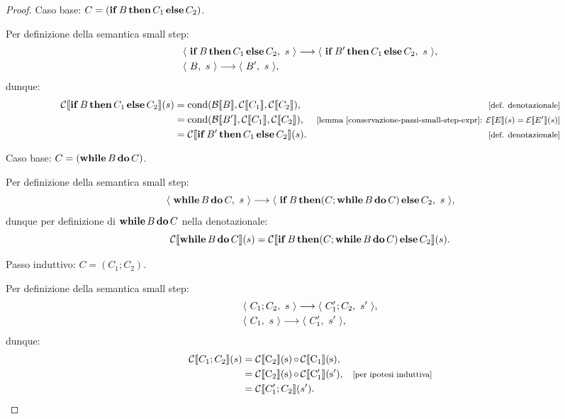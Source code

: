 \begin{proposizione}
\begin{proof}
Caso base: $C = (\mathop{\textup{\textbf{if}}} B \mathop{\textup{\textbf{then}}} C_1 \mathop{\textup{\textbf{else}}} C_2)$.

Per definizione della semantica small step:
\begin{align*}
  &\langle\ \mathop{\textup{\textbf{if}}} B \mathop{\textup{\textbf{then}}} C_1 \mathop{\textup{\textbf{else}}} C_2,\ s\ \rangle \longrightarrow 
  \langle\ \mathop{\textup{\textbf{if}}} B' \mathop{\textup{\textbf{then}}} C_1 \mathop{\textup{\textbf{else}}} C_2,\ s\ \rangle, \\
  &\langle\ B,\ s\ \rangle \longrightarrow \langle\ B',\ s\ \rangle,
\end{align*}
dunque:
\begin{align*}
  \calC\llbracket \kw{if} B \kw{then} C_1 \kw{else} C_2 \rrbracket(s)
  &= \cond(\calB\llbracket B \rrbracket, 
    \calC\llbracket C_1 \rrbracket,
    \calC\llbracket C_2 \rrbracket),
    &\law{def. denotazionale} \\
  &= \cond(\calB\llbracket B' \rrbracket, 
    \calC\llbracket C_1 \rrbracket,
    \calC\llbracket C_2 \rrbracket),
    &\law{lemma  
      \ref{conservazione-passi-small-step-expr}: 
      $\calE\llbracket E \rrbracket(s) 
      = \calE\llbracket E' \rrbracket(s)$} \\
  &= \calC\llbracket \kw{if} B' \kw{then} C_1 \kw{else} C_2 \rrbracket(s).
     &\law{def. denotazionale}
\end{align*}

Caso base:  $C = (\mathop{\textup{\textbf{while}}} B \mathop{\textup{\textbf{do}}} C)$.

Per definizione della semantica small step:
\[
  \langle\ \mathop{\textup{\textbf{while}}} B \mathop{\textup{\textbf{do}}} C,\ s\ \rangle \longrightarrow 
    \langle\ \mathop{\textup{\textbf{if}}} B \mathop{\textup{\textbf{then}}} (C ; \mathop{\textup{\textbf{while}}} B \mathop{\textup{\textbf{do}}} C) \mathop{\textup{\textbf{else}}} C_2,\ s\ \rangle,
\]
dunque per definizione di $\mathop{\textup{\textbf{while}}} B \mathop{\textup{\textbf{do}}} C$ nella denotazionale:
\[
  \mathcal{C}\llbracket \mathop{\textup{\textbf{while}}} B \mathop{\textup{\textbf{do}}} C \rrbracket(s)
    =  \mathcal{C}\llbracket \mathop{\textup{\textbf{if}}} B \mathop{\textup{\textbf{then}}} (C ; \mathop{\textup{\textbf{while}}} B \mathop{\textup{\textbf{do}}} C)
    \mathop{\textup{\textbf{else}}} C_2 \rrbracket(s).
\]


Passo induttivo: $C = (C_1; C_2)$.

Per definizione della semantica small step:
\begin{align*}
  &\langle\ C_1; C_2,\ s\ \rangle \longrightarrow \langle\ C_1'; C_2,\ s'\ \rangle, \\
  &\langle\ C_1,\ s\ \rangle \longrightarrow \langle\ C_1',\ s'\ \rangle,
\end{align*}
dunque:
\begin{align*}
  \calC\llbracket C_1; C_2 \rrbracket(s)
  &= \compfun{\calC\llbracket C_2 \rrbracket(s)}{\calC\llbracket C_1
    \rrbracket(s)}, \\
  &= \compfun{\calC\llbracket C_2 \rrbracket(s)}{\calC\llbracket C_1'
    \rrbracket(s')},
    &\law{per ipotesi induttiva} \\
  &= \calC\llbracket C_1'; C_2 \rrbracket(s').
\end{align*}
\end{proof}
\end{proposizione}

